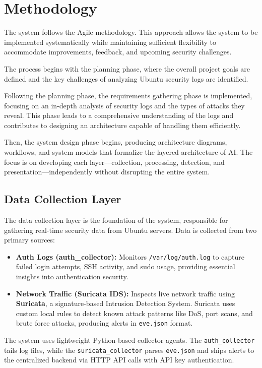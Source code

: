 \documentclass[12pt,a4paper]{report} %
\begin{document}
\section{Methodology}
The system follows the Agile methodology. This approach allows the system to be implemented systematically while maintaining sufficient flexibility to accommodate improvements, feedback, and upcoming security challenges.

The process begins with the planning phase, where the overall project goals are defined and the key challenges of analyzing Ubuntu security logs are identified.

Following the planning phase, the requirements gathering phase is implemented, focusing on an in-depth analysis of security logs and the types of attacks they reveal. This phase leads to a comprehensive understanding of the logs and contributes to designing an architecture capable of handling them efficiently.

Then, the system design phase begins, producing architecture diagrams, workflows, and system models that formalize the layered architecture of AI. The focus is on developing each layer—collection, processing, detection, and presentation—independently without disrupting the entire system.

\subsection{Data Collection Layer}
The data collection layer is the foundation of the system, responsible for gathering real-time security data from Ubuntu servers. Data is collected from two primary sources:

\begin{itemize}
    \item \textbf{Auth Logs (auth\_collector):} Monitors \texttt{/var/log/auth.log} to capture failed login attempts, SSH activity, and sudo usage, providing essential insights into authentication security.
    \item \textbf{Network Traffic (Suricata IDS):} Inspects live network traffic using \textbf{Suricata}, a signature-based Intrusion Detection System. Suricata uses custom local rules to detect known attack patterns like DoS, port scans, and brute force attacks, producing alerts in \texttt{eve.json} format.
\end{itemize}

The system uses lightweight Python-based collector agents. The \texttt{auth\_collector} tails log files, while the \texttt{suricata\_collector} parses \texttt{eve.json} and ships alerts to the centralized backend via HTTP API calls with API key authentication.
\end{document}
